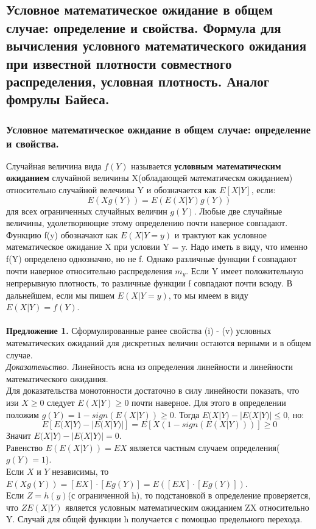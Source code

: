 \subsection{Условное математическое ожидание в общем случае: определение и свойства. Формула для вычисления условного математического ожидания при известной плотности совместного распределения, условная плотность. Аналог фомрулы Байеса.}
\subsubsection{Условное математическое ожидание в общем случае: определение и свойства.}
Случайная величина вида $f(Y)$ называется \textbf{условным математическим ожиданием} случайной величины X(обладающей математическм ожиданием) относительно случайной велечины Y и обозначается как $E[X|Y]$, если:\\
$$E(Xg(Y)) = E(E(X|Y)g(Y))$$
для всех ограниченных случайных величин $g(Y)$. Любые две случайные величины, удолетворяющие этому определению почти наверное совпадают.\\
Функцию f(y) обозначают как $E(X|Y = y)$ и трактуют как условное математическое ожидание X при условии Y = y. Надо иметь в виду, что именно f(Y) определено однозначно, но не f. Однако различные функции f совпадают почти наверное относительно распределения $m_y$. Если Y имеет положительную непрерывную плотность, то различные функции f совпадают почти всюду. В дальнейшем, если мы пишем $E(X|Y = y)$, то мы имеем в виду $E(X|Y) = f(Y)$.\\
\\
\textbf{Предложение 1.} Сформулированные ранее свойства (i) - (v) условных математических ожиданий для дискретных величин остаются верными и в общем случае.\\
\textit{Доказательство.} Линейность ясна из определения линейности и линейности математического ожидания.\\
Для доказательства монотонности достаточно в силу линейности показать, что изи $X \geq 0$ следует $E(X|Y)\geq 0$ почти наверное. Для этого в определении положим $g(Y) = 1 - sign(E(X|Y)) \geq 0$. Тогда $E(X|Y) - |E(X|Y)| \leq 0$, но:\\
$$E[E(X|Y) - |E(X|Y)|] = E[X(1 - sign(E(X|Y)))] \geq 0$$
Значит $E(X|Y) - |E(X|Y)| = 0$.\\
Равенство $E(E(X|Y)) = EX$ является частным случаем определения($g(Y) = 1$).\\
Если $X$ и $Y$ независимы, то $E(Xg(Y)) = [EX]\cdot [Eg(Y)] = E([EX]\cdot [Eg(Y)])$.\\
Если $Z = h(y)$(с ограниченной h), то подстановкой в определение проверяется, что $ZE(X|Y)$ является условным математическим ожиданием ZX относительно Y. Случай для общей функции h получается с помощью предельного перехода.

